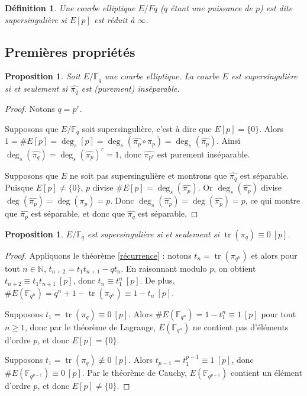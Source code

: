 \documentclass{article}
\theoremstyle{plain}%
\newtheorem{prop}[thm]{Proposition}
\newtheorem{deff}[thm]{Définition}
\theoremstyle{definition}%
\newcommand{\F}{\mathbb{F}}
\newcommand{\N}{\mathbb{N}}
\newcommand{\h}{\widehat}
\DeclareMathOperator{\tr}{tr}
\begin{document}
\begin{deff}
  Une courbe elliptique $E/Fq$ ($q$ étant une puissance de $p$) est dite supersingulière si $E[p]$ est réduit à $\infty$. 
\end{deff}

\subsection{Premières propriétés}

\begin{prop}
  \label{pihatsep}
  Soit $E/\F_q$ une courbe elliptique. La courbe $E$ est supersingulière si et seulement si $\widehat{\pi_q}$ est (purement) inséparable.
\end{prop}

\begin{proof}
  Notons $q = p^r$. 

  Supposons que $E/\F_q$ soit supersingulière, c'est à dire que $E[p] = \{0\}$. Alors $1 = \#E[p] = \deg_s[p] = \deg_s(\h{\pi_{p}} \circ \pi_{p}) = \deg_s(\h{\pi_{p}})$. Ainsi $\deg_s(\h{\pi_{q}}) =  \deg_s(\h{\pi_{p}})^r= 1$, donc $\h{\pi_{p^r}}$ est purement inséparable.

  Supposons que $E$ ne soit pas supersingulière et montrons que $\h{\pi_{q}}$ est séparable. Puisque $E[p] \neq \{0\}$, $p$ divise $\#E[p] = \deg_s(\h{\pi_p})$. Or $\deg_s(\h{\pi_p})$ divise $\deg(\h{\pi_p}) = \deg({\pi_p}) = p$. Donc $\deg_s(\h{\pi_p}) = \deg(\h{\pi_p}) =p$, ce qui montre que $\h{\pi_p}$ est séparable, et donc que $\h{\pi_q}$ est séparable.
\end{proof}

\begin{prop}
  \label{pimodp}
  $E/\F_q$ est supersingulière si et seulement si $\tr(\pi_q) \equiv 0\ [p]$. 
\end{prop}

\begin{proof}
  Appliquons le théorème \ref{récurrence} : 
  notons $t_n = \tr(\pi_{q^n})$ 
  et alors pour tout $n\in\N$, 
  $t_{n+2} = t_1 t_{n+1} -qt_n$.
  En raisonnant modulo $p$, on obtient $t_{n+2} \equiv t_1 t_{n+1}\ [p]$, donc $t_n \equiv t_1^n\ [p]$. 
  De plus, $\#E(\F_{q^n}) = q^n + 1 - \tr(\pi_{q^n}) \equiv 1 - t_n\ [p]$.

Supposons $t_1 = \tr(\pi_q) \equiv 0\ [p]$. 
Alors $\#E(\F_{q^n}) = 1 - t_1^n \equiv 1\ [p]$ pour tout $n \ge 1$, donc par le théorème de Lagrange, $E(\F_{q^n})$ ne contient pas d’éléments d’ordre $p$, et donc $E[p] = \{0\}$.

Supposons $t_1 = \tr(\pi_q) \not\equiv 0\ [p]$. 
Alors $t_{p-1} = t_1^{p-1} \equiv 1\ [p]$, donc $\#E(\F_{q^{p-1}}) \equiv 0\ [p]$. Par le théorème de Cauchy, $E(\F_{q^{p-1}})$ contient un élément d’ordre $p$, et donc $E[p] \neq  \{0\}$.
\end{proof}
\end{document}
